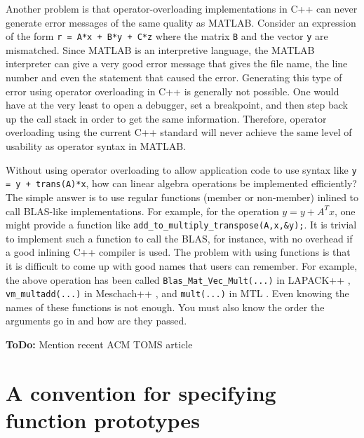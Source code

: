\documentclass[acmtoms,acmnow]{acmtrans2m}
\begin{document}
Another problem is that operator-overloading implementations in C++ can never
generate error messages of the same quality as MATLAB.  Consider an expression
of the form {}\texttt{r = A*x + B*y + C*z} where the matrix {}\texttt{B} and
the vector {}\texttt{y} are mismatched.  Since MATLAB is an interpretive
language, the MATLAB interpreter can give a very good error message that gives
the file name, the line number and even the statement that caused the error.
Generating this type of error using operator overloading in C++ is generally
not possible.  One would have at the very least to open a debugger, set a
breakpoint, and then step back up the call stack in order to get the same
information.  Therefore, operator overloading using the current C++ standard
will never achieve the same level of usability as operator syntax in MATLAB.

Without using operator overloading to allow application code to use syntax
like {}\texttt{y = y + trans(A)*x}, how can linear algebra operations be
implemented efficiently?  The simple answer is to use regular functions
(member or non-member) inlined to call BLAS-like implementations.  For
example, for the operation $y = y + A^T x$, one might provide a function like
{}\texttt{add\_to\_multiply\_transpose(A,x,\&y);}.  It is trivial to implement
such a function to call the BLAS, for instance, with no overhead if a good
inlining C++ compiler is used.  The problem with using functions is that it is
difficult to come up with good names that users can remember.  For example,
the above operation has been called {}\texttt{Blas\_Mat\_Vec\_Mult(...)} in
LAPACK++ {}\cite{ref:pozo_1996}, {}\texttt{vm\_multadd(...)} in Meschach++
{}\cite{ref:roberts_et_al_1996}, and {}\texttt{mult(...)} in MTL
{}\cite{ref:lumsdaine_and_siek_1998}.  Even knowing the names of these
functions is not enough.  You must also know the order the arguments go in and
how are they passed.

{}\textbf{ToDo:} Mention recent ACM TOMS article 

\section{A convention for specifying function prototypes}
\end{document}
